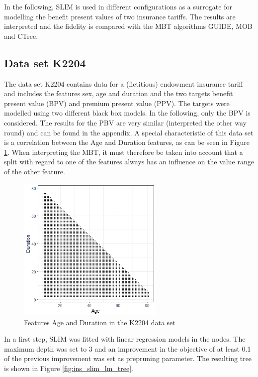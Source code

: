 In the following, SLIM is used in different configurations as a surrogate for modelling the benefit present values of two insurance tariffs. The results are interpreted and the fidelity is compared with the MBT algorithms GUIDE, MOB and CTree.

\subsection{Data set K2204}
The data set K2204 contains data for a (fictitious) endowment insurance tariff and includes the features sex, age and duration and the two targets benefit present value (BPV) and premium present value (PPV). The targets were modelled using two different black box models.  
In the following, only the BPV is considered. The results for the PBV are very similar (interpreted the other way round) and can be found in the appendix. A special characteristic of this data set is a correlation between the Age and Duration features, as can be seen in Figure \ref{fig:ins_corr_age_duration}. When interpreting the MBT, it must therefore be taken into account that a split with regard to one of the features always has an influence on the value range of the other feature.

\begin{figure}[!htb]
    \centering    
    \includegraphics[width=7cm]{Figures/insurance_use_case/k2204_BPV/corr_age_duration.png}
    \caption{Features Age and Duration in the K2204 data set}
    \label{fig:ins_corr_age_duration}
\end{figure}

In a first step, SLIM was fitted with linear regression models in the nodes. The maximum depth was set to 3 and an improvement in the objective of at least 0.1 of the previous improvement was set as prepruning parameter.
 The resulting tree is shown in Figure \ref{fig:ins_slim_lm_tree}.

